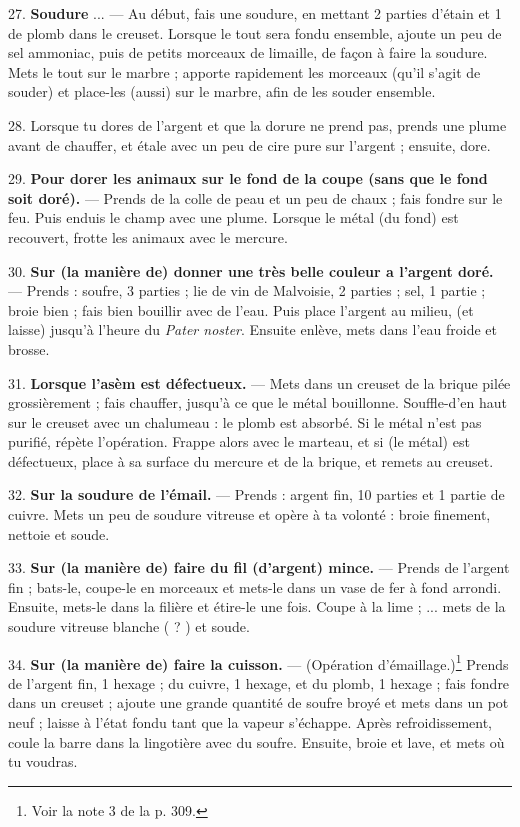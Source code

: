 \documentclass[a4paper, 11pt, oneside, polutonikogreek, french]{article}
\begin{document}
27. \textbf{Soudure} ... --- Au début, fais une soudure, en mettant 2 parties d'étain et 1 de plomb dans le creuset. Lorsque le tout sera fondu ensemble, ajoute un peu de sel ammoniac, puis de petits morceaux de limaille, de façon à faire la soudure. Mets le tout sur le marbre ; apporte rapidement les morceaux (qu'il s'agit de souder) et place-les (aussi) sur le marbre, afin de les souder ensemble.

28. Lorsque tu dores de l'argent et que la dorure ne prend pas, prends une plume avant de chauffer, et étale avec un peu de cire pure sur l'argent ; ensuite, dore.

29. \textbf{Pour dorer les animaux sur le fond de la coupe (sans que le fond soit doré).} --- Prends de la colle de peau et un peu de chaux ; fais fondre sur le feu. Puis enduis le champ avec une plume. Lorsque le métal (du fond) est recouvert, frotte les animaux avec le mercure.

30. \textbf{Sur (la manière de) donner une très belle couleur a l'argent doré.} --- Prends : soufre, 3 parties ; lie de vin de Malvoisie, 2 parties ; sel, 1 partie ; broie bien ; fais bien bouillir avec de l'eau. Puis place l'argent au milieu, (et laisse) jusqu'à l'heure du \emph{Pater noster}. Ensuite enlève, mets dans l'eau froide et brosse.

31. \textbf{Lorsque l'asèm est défectueux.} --- Mets dans un creuset de la brique pilée grossièrement ; fais chauffer, jusqu'à ce que le métal bouillonne. Souffle-d'en haut sur le creuset avec un chalumeau : le plomb est absorbé. Si le métal n'est pas purifié, répète l'opération. Frappe alors avec le marteau, et si (le métal) est défectueux, place à sa surface du mercure et de la brique, et remets au creuset.

32. \textbf{Sur la soudure de l'émail.} --- Prends : argent fin, 10 parties et 1 partie de cuivre. Mets un peu de soudure vitreuse et opère à ta volonté : broie finement, nettoie et soude.

33. \textbf{Sur (la manière de) faire du fil (d'argent) mince.} --- Prends de l'argent fin ; bats-le, coupe-le en morceaux et mets-le dans un vase de fer à fond arrondi. Ensuite, mets-le dans la filière et étire-le une fois. Coupe à la lime ; ... mets de la soudure vitreuse blanche ( ? ) et soude.

34. \textbf{Sur (la manière de) faire la cuisson.} --- (Opération d'émaillage.)\footnote{Voir la note 3 de la p. 309.} Prends de l'argent fin, 1 hexage ; du cuivre, 1 hexage, et du plomb, 1 hexage ; fais fondre dans un creuset ; ajoute une grande quantité de soufre broyé et mets dans un pot neuf ; laisse à l'état fondu tant que la vapeur s'échappe. Après refroidissement, coule la barre dans la lingotière avec du soufre. Ensuite, broie et lave, et mets où tu voudras.
\end{document}
